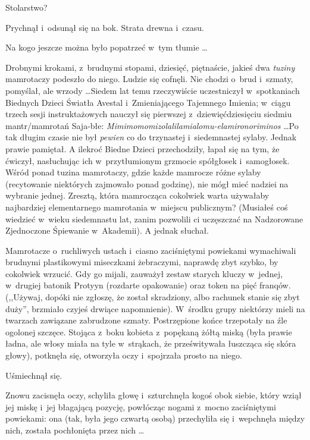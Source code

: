 \documentclass[oneside,polish,11pt,rmheadings]{mwbk}
\begin{document}
Stolarstwo? 

Prychnął i~odsunął się na bok. Strata drewna i~czasu. 

Na kogo jeszcze można było popatrzeć w~tym tłumie \ldots  

Drobnymi krokami, z~brudnymi stopami, dziesięć, piętnaście, jakieś dwa \textit{tuziny} mamrotaczy podeszło do niego. Ludzie się cofnęli. Nie chodzi o~brud i~szmaty, pomyślał, ale wrzody \ldots  Siedem lat temu rzeczywiście uczestniczył w~spotkaniach Biednych Dzieci Światła Avestal i~Zmieniającego Tajemnego Imienia; w~ciągu trzech sesji instruktażowych nauczył się pierwszej z~dziewięćdziesięciu siedmiu mantr/mamrotań Saja-błe: \textit{Mi\-mi\-mo\-mo\-mi\-zo\-la\-li\-la\-mi\-alo\-mu-ela\-mi\-ro\-no\-ri\-mi\-nos } \ldots  Po tak długim czasie nie był \textit{pewien }co do trzynastej i~siedemnastej sylaby. Jednak prawie pamiętał. A ilekroć Biedne Dzieci przechodziły, łapał się na tym, że ćwiczył, nasłuchując ich w~przytłumionym grzmocie spółgłosek i~samogłosek. Wśród ponad tuzina mamrotaczy, gdzie każde mamrocze różne sylaby (recytowanie niektórych zajmowało ponad godzinę), nie mógł mieć nadziei na wybranie jednej. Zresztą, która mamrocząca cokolwiek warta używałaby najbardziej elementarnego mamrotania w~miejscu publicznym? (Musiałeś coś wiedzieć w~wieku siedemnastu lat, zanim pozwolili ci uczęszczać na Nadzorowane Zjednoczone Śpiewanie w~Akademii). A jednak słuchał.  

Mamrotacze o~ruchliwych ustach i~ciasno zaciśniętymi powiekami wymachiwali brudnymi plastikowymi miseczkami żebraczymi, naprawdę zbyt szybko, by cokolwiek wrzucić. Gdy go mijali, zauważył zestaw starych kluczy w~jednej, w~drugiej batonik Protyyn (rozdarte opakowanie) oraz token na pięć franqów. (,,Używaj, dopóki nie zgłoszę, że został skradziony, albo rachunek stanie się zbyt duży'', brzmiało czyjeś drwiące napomnienie). W~środku grupy niektórzy mieli na twarzach zawiązane zabrudzone szmaty. Postrzępione końce trzepotały na źle ogolonej szczęce. Stojąca z~boku kobieta z~popękaną żółtą miską (była prawie ładna, ale włosy miała na tyle w~strąkach, że prześwitywała łuszcząca się skóra głowy), potknęła się, otworzyła oczy i~spojrzała prosto na niego.  

Uśmiechnął się.  

Znowu zacisnęła oczy, schyliła głowę i~szturchnęła kogoś obok siebie, który wziął jej miskę i~jej błagającą pozycję, powłócząc nogami z~mocno zaciśniętymi powiekami: ona (tak, była jego czwartą osobą) przechyliła się i~wepchnęła między nich, została pochłonięta przez nich \ldots  
\end{document}
